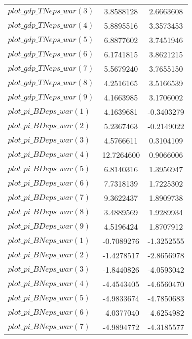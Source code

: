\begin{center}
\begin{longtable}{lcc}
$plot\_gdp\_TN eps\_war (3)  $	 & 	      3.8588128	 & 	      2.6663608 \\ 
$plot\_gdp\_TN eps\_war (4)  $	 & 	      5.8895516	 & 	      3.3573453 \\ 
$plot\_gdp\_TN eps\_war (5)  $	 & 	      6.8877602	 & 	      3.7451946 \\ 
$plot\_gdp\_TN eps\_war (6)  $	 & 	      6.1741815	 & 	      3.8621215 \\ 
$plot\_gdp\_TN eps\_war (7)  $	 & 	      5.5679240	 & 	      3.7655150 \\ 
$plot\_gdp\_TN eps\_war (8)  $	 & 	      4.2516165	 & 	      3.5166539 \\ 
$plot\_gdp\_TN eps\_war (9)  $	 & 	      4.1663985	 & 	      3.1706002 \\ 
$plot\_pi\_BD eps\_war (1)   $	 & 	      4.1639681	 & 	     -0.3403279 \\ 
$plot\_pi\_BD eps\_war (2)   $	 & 	      5.2367463	 & 	     -0.2149022 \\ 
$plot\_pi\_BD eps\_war (3)   $	 & 	      4.5766611	 & 	      0.3104109 \\ 
$plot\_pi\_BD eps\_war (4)   $	 & 	     12.7264600	 & 	      0.9066006 \\ 
$plot\_pi\_BD eps\_war (5)   $	 & 	      6.8140316	 & 	      1.3956947 \\ 
$plot\_pi\_BD eps\_war (6)   $	 & 	      7.7318139	 & 	      1.7225302 \\ 
$plot\_pi\_BD eps\_war (7)   $	 & 	      9.3622437	 & 	      1.8909738 \\ 
$plot\_pi\_BD eps\_war (8)   $	 & 	      3.4889569	 & 	      1.9289934 \\ 
$plot\_pi\_BD eps\_war (9)   $	 & 	      4.5196424	 & 	      1.8707912 \\ 
$plot\_pi\_BN eps\_war (1)   $	 & 	     -0.7089276	 & 	     -1.3252555 \\ 
$plot\_pi\_BN eps\_war (2)   $	 & 	     -1.4278517	 & 	     -2.8656978 \\ 
$plot\_pi\_BN eps\_war (3)   $	 & 	     -1.8440826	 & 	     -4.0593042 \\ 
$plot\_pi\_BN eps\_war (4)   $	 & 	     -4.4543405	 & 	     -4.6560470 \\ 
$plot\_pi\_BN eps\_war (5)   $	 & 	     -4.9833674	 & 	     -4.7850683 \\ 
$plot\_pi\_BN eps\_war (6)   $	 & 	     -4.0377040	 & 	     -4.6254982 \\ 
$plot\_pi\_BN eps\_war (7)   $	 & 	     -4.9894772	 & 	     -4.3185577 \\ 

\end{longtable}
\end{center}
